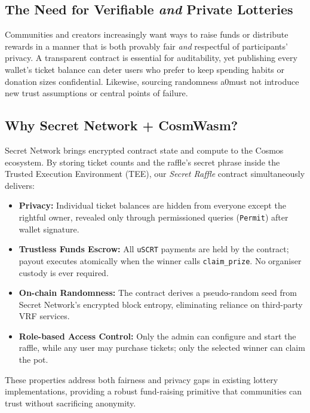 \documentclass[12pt]{article}
\begin{document}
\subsection*{The Need for Verifiable \emph{and} Private Lotteries}
Communities and creators increasingly want ways to raise funds or distribute rewards in a manner that is both provably fair \emph{and} respectful of participants' privacy.  A transparent contract is essential for auditability, yet publishing every wallet's ticket balance can deter users who prefer to keep spending habits or donation sizes confidential.  Likewise, sourcing randomness a0must not introduce new trust assumptions or central points of failure.

\subsection*{Why Secret Network + CosmWasm?}
Secret Network brings encrypted contract state and compute to the Cosmos ecosystem.  By storing ticket counts and the raffle's secret phrase inside the Trusted Execution Environment (TEE), our \emph{Secret Raffle} contract simultaneously delivers:

\begin{itemize}
  \item \textbf{Privacy:} Individual ticket balances are hidden from everyone except the rightful owner, revealed only through permissioned queries (\texttt{Permit}) after wallet signature.
  \item \textbf{Trustless Funds Escrow:} All \texttt{uSCRT} payments are held by the contract; payout executes atomically when the winner calls \texttt{claim\_prize}.  No organiser custody is ever required.
  \item \textbf{On-chain Randomness:} The contract derives a pseudo-random seed from Secret Network's encrypted block entropy, eliminating reliance on third-party VRF services.
  \item \textbf{Role-based Access Control:} Only the admin can configure and start the raffle, while any user may purchase tickets; only the selected winner can claim the pot.
\end{itemize}

These properties address both fairness and privacy gaps in existing lottery implementations, providing a robust fund-raising primitive that communities can trust without sacrificing anonymity.
\end{document}

